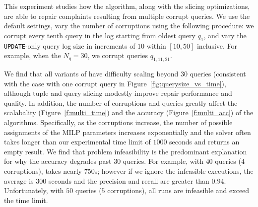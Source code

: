  
This experiment studies how the \naive algorithm, along with the slicing optimizations, are able to repair complaints resulting from multiple corrupt queries.
We use the default settings, vary the number of corruptions using the following procedure:
we  corrupt every tenth query in the log starting from oldest query $q_1$, and vary the \texttt{UPDATE}-only query log size  in increments of $10$ within $[10, 50]$ inclusive.
For example, when the $N_q = {30}$, we corrupt queries $q_{1,11,21}$. 

We find that all variants of \naive have difficulty scaling beyond $30$ queries (consistent with the case with one corrupt query in Figure~\ref{fig:querysize_vs_time}), although tuple and query slicing modestly improve repair performance and quality.
In addition, the number of corruptions and queries greatly affect the scalabality (Figure~\ref{f:multi_time}) and the accuracy (Figure~\ref{f:multi_acc}) of the algorithms. 
Specifically, as the corruptions increase, the number of possible assignments of the MILP parameters increases exponentially and the solver often takes longer than our experimental time limit of $1000$ seconds and returns an empty result.
We find that problem infeasibility is the predominant explanation for why the accuracy degrades past $30$ queries.  
For example, with $40$ queries ($4$ corruptions), \naive takes nearly $750$s; however if we ignore the infeasible executions, the average is $300$ seconds and the precision and recall are greater than $0.94$.  
Unfortunately, with $50$ queries ($5$ corruptions), all runs are infeasible and exceed the time limit.

